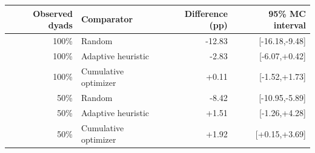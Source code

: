 \begin{tabular}{rlrr}\toprule
Observed dyads & Comparator & Difference (pp) & 95\% MC interval \\ \midrule
100\% & Random & -12.83 & [-16.18,-9.48] \\
100\% & Adaptive heuristic & -2.83 & [-6.07,+0.42] \\
100\% & Cumulative optimizer & +0.11 & [-1.52,+1.73] \\
50\% & Random & -8.42 & [-10.95,-5.89] \\
50\% & Adaptive heuristic & +1.51 & [-1.26,+4.28] \\
50\% & Cumulative optimizer & +1.92 & [+0.15,+3.69] \\
\bottomrule\end{tabular}